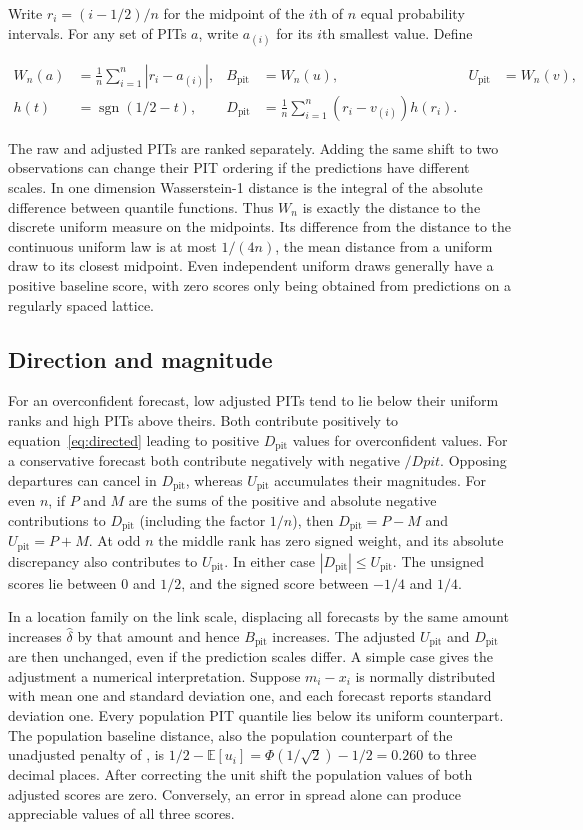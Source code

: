 \documentclass[twoside,11pt,hyphens]{article}
\newcommand{\Bpit}{B_{\mathrm{pit}}}
\newcommand{\Dpit}{D_{\mathrm{pit}}}
\newcommand{\Upit}{U_{\mathrm{pit}}}
\DeclareMathOperator{\sgn}{sgn}
\begin{document}
Write $r_i=(i-1/2)/n$ for the midpoint of the $i$th of $n$ equal probability intervals. For any set of PITs $a$, write $a_{(i)}$ for its $i$th smallest value. Define

\begin{align}
 W_n(a)&=\frac1n\sum_{i=1}^n |r_i-a_{(i)}|, &
 \Bpit&= W_n(u), & \Upit&= W_n(v), \label{eq:unsigned}\\
 h(t)&=\sgn(1/2-t), &
 \Dpit&=\frac1n\sum_{i=1}^n (r_i-v_{(i)})h(r_i). &&\label{eq:directed}
\end{align}

The raw and adjusted PITs are ranked separately. Adding the same shift to two observations can change their PIT ordering if the predictions have different scales. In one dimension Wasserstein-1 distance is the integral of the absolute difference between quantile functions. Thus $W_n$ is exactly the distance to the discrete uniform measure on the midpoints. Its difference from the distance to the continuous uniform law is at most $1/(4n)$, the mean distance from a uniform draw to its closest midpoint. Even independent uniform draws generally have a positive baseline score, with zero scores only being obtained from predictions on a regularly spaced lattice.

\subsection{Direction and magnitude}

For an overconfident forecast, low adjusted PITs tend to lie below their uniform ranks and high PITs above theirs. Both contribute positively to equation~\eqref{eq:directed} leading to positive $\Dpit$ values for overconfident values. For a conservative forecast both contribute negatively with negative $/Dpit$. Opposing departures can cancel in $\Dpit$, whereas $\Upit$ accumulates their magnitudes. For even $n$, if $P$ and $M$ are the sums of the positive and absolute negative contributions to $\Dpit$ (including the factor $1/n$), then $\Dpit=P-M$ and $\Upit=P+M$. At odd $n$ the middle rank has zero signed weight, and its absolute discrepancy also contributes to $\Upit$. In either case $|\Dpit|\leq\Upit$. The unsigned scores lie between 0 and $1/2$, and the signed score between $-1/4$ and $1/4$.

In a location family on the link scale, displacing all forecasts by the same amount increases $\widehat\delta$ by that amount and hence $\Bpit$ increases. The adjusted $\Upit$ and $\Dpit$ are then unchanged, even if the prediction scales differ. A simple case gives the adjustment a numerical interpretation. Suppose $m_i-x_i$ is normally distributed with mean one and standard deviation one, and each forecast reports standard deviation one. Every population PIT quantile lies below its uniform counterpart. The population baseline distance, also the population counterpart of the unadjusted penalty of \citet{wessel2025}, is $1/2-\mathbb{E}[u_i]=\Phi(1/\sqrt{2})-1/2=0.260$ to three decimal places. After correcting the unit shift the population values of both adjusted scores are zero. Conversely, an error in spread alone can produce appreciable values of all three scores.
\end{document}
